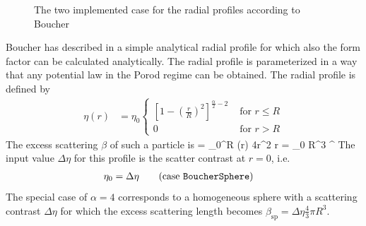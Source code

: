 \begin{figure}[htb]
\begin{center}
\hfill
{}
\end{center}
\caption{The two implemented case for the radial profiles according to Boucher \cite{Boucher1983}}
\label{fig:Boucherprofilea}
\end{figure}

Boucher  has described in \cite{Boucher1983} a simple analytical radial profile for which also the form factor can be calculated analytically. The radial profile is parameterized in a way that any potential law in the Porod regime can be obtained. The radial profile is defined by
\begin{align}
    \label{eq:profileBoucherSphere}
    \eta(r) &= \eta_0
    \begin{cases}
        \left[1-\left(\frac{r}{R}\right)^2 \right]^{\frac{\alpha}{2}-2} & \mbox{ for } r \leq R \\
        0 & \mbox{ for } r > R
    \end{cases}
\end{align}
The excess scattering $\beta$ of such a particle is
\BE
\beta = \int_0^R \eta(r) 4\pi r^2 r = \eta_0  R^3 \pi^{} 
\EE
The input value $\Delta\eta$ for this profile is the scatter contrast at $r=0$, i.e.
\begin{align}
\eta_0&=\Delta\eta \qquad \mbox{(case \texttt{BoucherSphere})}
\label{eq:eta0BoucherSphere}
\end{align}
The special case of $\alpha=4$ corresponds to a homogeneous sphere with a scattering contrast $\Delta\eta$ for which the excess scattering length becomes $\beta_\mathrm{sp}=\Delta\eta \frac{4}{3}\pi R^3$.

